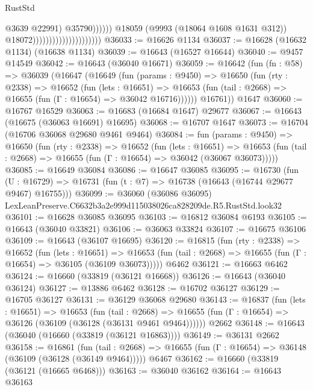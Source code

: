 \begin{lexlean}{RustStd}
\begin{coremodule}
                                                            @3639
                                                            @22991)
                                                          @35790))))))
                                              @18059
                                              (@9993 (@18064 @1608 @1631 @312))
                                              @18072)))))))))))))))))))))
@36033 := @16626 @1134
@36037 := @16628 (@16632 @1134) (@16638 @1134)
@36039 := @16643 (@16527 @16644)
@36040 := @9457 @14549
@36042 := @16643 (@36040 @16671)
@36059 := @16642
    (fun (fn : @58) =>
    @36039
      (@16647
        (@16649
          (fun (params : @9450) =>
          @16650
            (fun (rty : @2338) =>
            @16652
              (fun (lets : @16651) =>
              @16653 (fun (tail : @2668) => @16655 (fun (Γ : @16654) => @36042 @16716))))))
        @16761))
    @1647
@36060 := @16767 @16529
@36063 := @16683 (@16684 @1647) @29677
@36067 := @16643 (@16675 (@36063 @16691) @16695)
@36068 := @16707 @1647
@36073 := @16704 (@16706 @36068 @29680 @9461 @9464)
@36084 := fun (params : @9450) =>
  @16650
    (fun (rty : @2338) =>
    @16652
      (fun (lets : @16651) =>
      @16653 (fun (tail : @2668) => @16655 (fun (Γ : @16654) => @36042 (@36067 @36073)))))
@36085 := @16649 @36084
@36086 := @16647 @36085
@36095 := @16730
    (fun (U : @16729) => @16731 (fun (t : @7) => @16738 (@16643 (@16744 @29677 @9467) @16755)))
@36099 := @36060 (@36086 @36095) LexLeanPreserve.C6632b3a2e999d115038026ca828209de.R5.RustStd.look32
@36101 := @16628 @36085 @36095
@36103 := @16812 @36084 @6193
@36105 := @16643 (@36040 @33821)
@36106 := @36063 @33824
@36107 := @16675 @36106
@36109 := @16643 (@36107 @16695)
@36120 := @16815
    (fun (rty : @2338) =>
    @16652
      (fun (lets : @16651) =>
      @16653 (fun (tail : @2668) => @16655 (fun (Γ : @16654) => @36105 (@36109 @36073)))))
    @6462
@36121 := @16663 @6462
@36124 := @16660 (@33819 (@36121 @16668))
@36126 := @16643 (@36040 @36124)
@36127 := @13886 @6462
@36128 := @16702 @36127
@36129 := @16705 @36127
@36131 := @36129 @36068 @29680
@36143 := @16837
    (fun (lets : @16651) =>
    @16653
      (fun (tail : @2668) =>
      @16655 (fun (Γ : @16654) => @36126 (@36109 (@36128 (@36131 @9461 @9464))))))
    @2662
@36148 := @16643 (@36040 (@16660 (@33819 (@36121 @16863))))
@36149 := @36131 @2662
@36158 := @16861
    (fun (tail : @2668) => @16655 (fun (Γ : @16654) => @36148 (@36109 (@36128 (@36149 @9464)))))
    @6467
@36162 := @16660 (@33819 (@36121 (@16665 @6468)))
@36163 := @36040 @36162
@36164 := @16643 @36163

\end{coremodule}
\end{lexlean}
